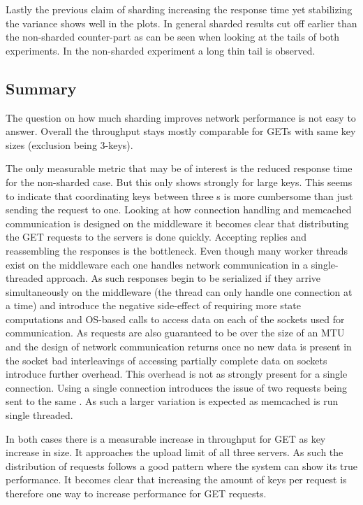         Lastly the previous claim of sharding increasing the response time yet stabilizing the variance shows well in
        the plots. In general sharded results cut off earlier than the non-sharded counter-part as can be seen when
        looking at the tails of both experiments. In the non-sharded experiment a long thin tail is observed.

    \subsection{Summary\label{subsec:5_summary}}

        The question on how much sharding improves network performance is not easy to answer. Overall the throughput
        stays mostly comparable for GETs with same key sizes (exclusion being 3-keys).

        The only measurable metric that may be of interest is the reduced response time for the non-sharded case. But
        this only shows strongly for large keys. This seems to indicate that coordinating keys between three \srv{}s is
        more cumbersome than just sending the request to one. Looking at how connection handling and memcached
        communication is designed on the middleware it becomes clear that distributing the GET requests to the servers
        is done quickly. Accepting replies and reassembling the responses is the bottleneck. Even though many worker
        threads exist on the middleware each one handles network communication in a single-threaded approach. As such
        responses begin to be serialized if they arrive simultaneously on the middleware (the thread can only handle one
        connection at a time) and introduce the negative side-effect of requiring more state computations and OS-based
        calls to access data on each of the sockets used for communication. As requests are also guaranteed to be over
        the size of an MTU and the design of network communication returns once no new data is present in the socket bad
        interleavings of accessing partially complete data on sockets introduce further overhead. This overhead is not
        as strongly present for a single connection. Using a single connection introduces the issue of two requests
        being sent to the same \srv{}. As such a larger variation is expected as memcached is run single threaded.

        In both cases there is a measurable increase in throughput for GET as key increase in size. It approaches the
        upload limit of all three servers. As such the distribution of requests follows a good pattern where the system
        can show its true performance. It becomes clear that increasing the amount of keys per request is therefore one
        way to increase performance for GET requests.

